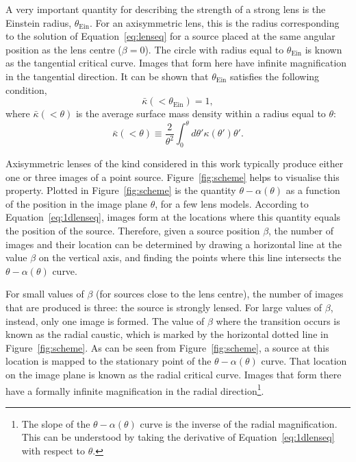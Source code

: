 \documentclass{aa}
\def\tein{\theta_{\mathrm{Ein}}}
\def\Fref#1{Figure~\ref{#1}\xspace}
\def\Eref#1{Equation~\ref{#1}\xspace}
\begin{document}
A very important quantity for describing the strength of a strong lens is the Einstein radius, $\tein$. For an axisymmetric lens, this is the radius corresponding to the solution of \Eref{eq:lenseq} for a source placed at the same angular position as the lens centre ($\beta=0$).
The circle with radius equal to $\tein$ is known as the tangential critical curve. Images that form here have infinite magnification in the tangential direction.
%
It can be shown that $\tein$ satisfies the following condition,
\begin{equation}\label{eq:criteq}
\bar{\kappa}(<\tein) = 1,
\end{equation}
where $\bar{\kappa}(<\theta)$ is the average surface mass density within a radius equal to $\theta$:
\begin{equation}
\bar{\kappa}(<\theta) \equiv \frac{2}{\theta^2}\int_0^{\theta}d\theta' \kappa(\theta')\theta'.
\end{equation}

Axisymmetric lenses of the kind considered in this work 
typically produce either one or three images of a point source.
\Fref{fig:scheme} helps to visualise this property.
Plotted in \Fref{fig:scheme} is the quantity $\theta - \alpha(\theta)$ as a function of the position in the image plane $\theta$, for a few lens models.
According to \Eref{eq:1dlenseq}, images form at the locations where this quantity equals the position of the source. 
Therefore, given a source position $\beta$, the number of images and their location can be determined by drawing a horizontal line at the value $\beta$ on the vertical axis, and finding the points where this line intersects the $\theta - \alpha(\theta)$ curve.

For small values of $\beta$ (for sources close to the lens centre), the number of images that are produced is three: the source is strongly lensed. For large values of $\beta$, instead, only one image is formed.
The value of $\beta$ where the transition occurs is known as the radial caustic, which is marked by the horizontal dotted line in \Fref{fig:scheme}. 
As can be seen from \Fref{fig:scheme}, a source at this location is mapped to the stationary point of the $\theta - \alpha(\theta)$ curve. 
That location on the image plane is known as the radial critical curve. 
Images that form there have a formally infinite magnification in the radial direction\footnote{The slope of the $\theta - \alpha(\theta)$ curve is the inverse of the radial magnification. This can be understood by taking the derivative of \Eref{eq:1dlenseq} with respect to $\theta$.}.
\end{document}
